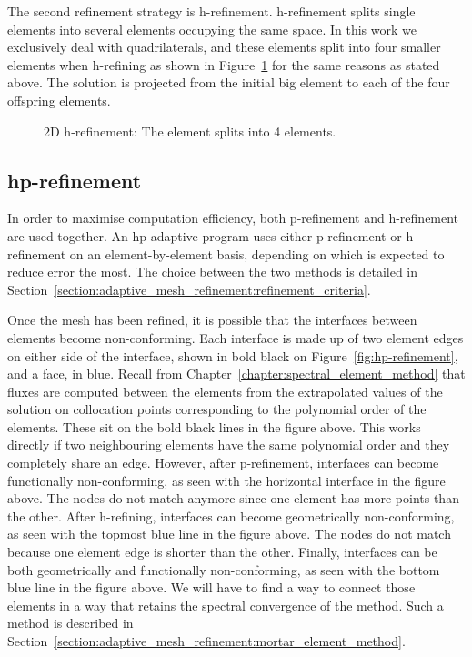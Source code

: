 The second refinement strategy is h-refinement\@. h-refinement splits single elements into several
elements occupying the same space. In this work we exclusively deal with quadrilaterals, and these
elements split into four smaller elements when h-refining as shown in Figure~\ref{fig:h-refinement}
for the same reasons as stated above. The solution is projected from the initial big element to each
of the four offspring elements.

\begin{figure}[H]
    \centering
    
    \caption{2D h-refinement: The element splits into 4 elements.}\label{fig:h-refinement}
\end{figure}

\subsection{hp-refinement}\label{subsection:adaptive_mesh_refinement:refinement_strategies:hp-refinement}

In order to maximise computation efficiency, both p-refinement and h-refinement are used together.
An hp-adaptive program uses either p-refinement or h-refinement on an element-by-element basis,
depending on which is expected to reduce error the most. The choice between the two methods is
detailed in Section~\ref{section:adaptive_mesh_refinement:refinement_criteria}.

Once the mesh has been refined, it is possible that the interfaces between elements become
non-conforming. Each interface is made up of two element edges on either side of the interface,
shown in bold black on Figure~\ref{fig:hp-refinement}, and a face, in blue. Recall from
Chapter~\ref{chapter:spectral_element_method} that fluxes are computed between the elements from the
extrapolated values of the solution on collocation points corresponding to the polynomial order of
the elements. These sit on the bold black lines in the figure above. This works directly if two
neighbouring elements have the same polynomial order and they completely share an edge. However,
after p-refinement, interfaces can become functionally non-conforming, as seen with the horizontal
interface in the figure above. The nodes do not match anymore since one element has more points than
the other. After h-refining, interfaces can become geometrically non-conforming, as seen with the
topmost blue line in the figure above. The nodes do not match because one element edge is shorter
than the other. Finally, interfaces can be both geometrically and functionally non-conforming, as
seen with the bottom blue line in the figure above. We will have to find a way to connect those
elements in a way that retains the spectral convergence of the method. Such a method is described in
Section~\ref{section:adaptive_mesh_refinement:mortar_element_method}.

